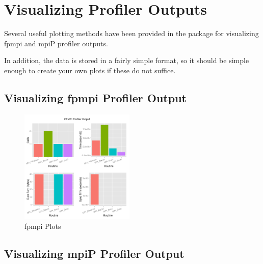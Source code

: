 \section{Visualizing Profiler Outputs}

Several useful plotting methods have been provided in the  package for visualizing fpmpi and mpiP profiler outputs.  

In addition, the data is stored in a fairly simple format, so it should be simple enough to create your own plots if these do not suffice.

\subsection{Visualizing fpmpi Profiler Output}

\begin{figure}
  \centering
  \includegraphics[width=0.485\textwidth]{include/pics/fpmpi}
  \caption{fpmpi Plots}
  \label{fig:fpmpi}
\end{figure}


\subsection{Visualizing mpiP Profiler Output}

